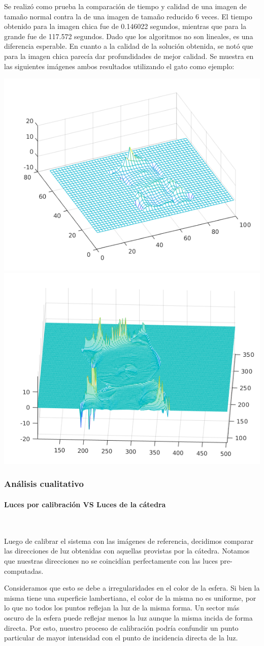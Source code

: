 Se realizó como prueba la comparación de tiempo y calidad de una imagen de tamaño normal contra la de una imagen de tamaño reducido 6 veces. El tiempo obtenido para la imagen chica fue de 0.146022 segundos, mientras que para la grande fue de 117.572 segundos. Dado que los algoritmos no son lineales, es una diferencia esperable. En cuanto a la calidad de la solución obtenida, se notó que para la imagen chica parecía dar profundidades de mejor calidad. Se muestra en las siguientes imágenes ambos resultados utilizando el gato como ejemplo:

\begin{center}
\includegraphics[width=.4\linewidth]{imagenes/gato_small_model_1511.png}
\includegraphics[width=.4\linewidth]{imagenes/gato_model_1511.png}
\end{center}


\subsubsection{Análisis cualitativo}

\paragraph{Luces por calibración VS Luces de la cátedra}
\

Luego de calibrar el sistema con las imágenes de referencia, decidimos comparar
las direcciones de luz obtenidas con aquellas provistas por la cátedra. Notamos
que nuestras direcciones no se coincidían perfectamente con las luces pre-computadas.

Consideramos que esto se debe a irregularidades en el color de la esfera. Si bien la misma
tiene una superficie lambertiana, el color de la misma no es uniforme, por lo que no
todos los puntos reflejan la luz de la misma forma. Un sector más oscuro de la esfera
puede reflejar menos la luz aunque la misma incida de forma directa. Por esto, nuestro proceso
de calibración podría confundir un punto particular de mayor intensidad con el punto de
incidencia directa de la luz.

